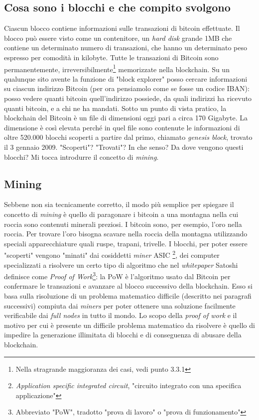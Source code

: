 \documentclass {article}
\begin{document}
\subsection {Cosa sono i blocchi e che compito svolgono}

Ciascun blocco contiene informazioni sulle transazioni di bitcoin effettuate.
Il blocco può essere visto come un contenitore, un \textit{hard disk} grande 1MB che contiene un determinato numero di transazioni, che hanno un determinato peso espresso per comodità in kilobyte.
Tutte le transazioni di Bitcoin sono permanentemente, irreversibilmente\footnote{Nella stragrande maggioranza dei casi, vedi punto 3.3.1} memorizzate nella blockchain.
Su un qualunque sito avente la funzione di "block explorer" posso cercare informazioni su ciascun indirizzo Bitcoin (per ora pensiamolo come se fosse un codice IBAN): posso vedere quanti bitcoin quell'indirizzo possiede, da quali indirizzi ha ricevuto quanti bitcoin, e a chi ne ha mandati.
Sotto un punto di vista pratico, la blockchain del Bitcoin è un file di dimensioni oggi pari a circa 170 Gigabyte.
La dimensione è così elevata perché in quel file sono contenute le informazioni di oltre 520.000 blocchi scoperti a partire dal primo, chiamato \textit{genesis block}, trovato il 3 gennaio 2009.
"Scoperti"? "Trovati"? In che senso? Da dove vengono questi blocchi? Mi tocca introdurre il concetto di \textit{mining}.


\subsection {Mining}


Sebbene non sia tecnicamente corretto, il modo più semplice per spiegare il concetto di \textit{mining} è quello di paragonare i bitcoin a una montagna nella cui roccia sono contenuti minerali preziosi.
I bitcoin sono, per esempio, l'oro nella roccia.
Per trovare l'oro bisogna scavare nella roccia della montagna utilizzando speciali apparecchiature quali ruspe, trapani, trivelle.
I blocchi, per poter essere "scoperti" vengono "minati" dai cosiddetti \textit{miner} ASIC \footnote{\textit{Application specific integrated circuit}, "circuito integrato con una specifica applicazione"}, dei computer specializzati a risolvere un certo tipo di algoritmo che nel \textit{whitepaper} Satoshi definisce come \textit{Proof of Work}\footnote{Abbreviato "PoW", tradotto "prova di lavoro" o "prova di funzionamento"}: la PoW è l'algoritmo usato dal Bitcoin per confermare le transazioni e avanzare al blocco successivo della blockchain.
Esso si basa sulla risoluzione di un problema matematico difficile (descritto nei paragrafi successivi) compiuta dai \textit{miners} per poter ottenere una soluzione facilmente verificabile dai \textit{full nodes} in tutto il mondo.
Lo scopo della \textit{proof of work} e il motivo per cui è presente un difficile problema matematico da risolvere è quello di impedire la generazione illimitata di blocchi e di conseguenza di abusare della blockchain.
\end{document}
